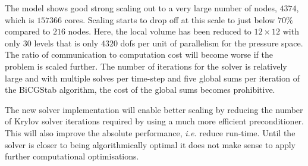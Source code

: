 \documentclass[review,times]{elsarticle}
\begin{document}
The model shows good strong scaling out to a very large number of nodes,
$4374$, which is $157366$ cores. Scaling starts to drop off at this
scale to just below $70\%$ compared to $216$ nodes. Here, the local
volume has been reduced to $12\times 12$ with only $30$ levels that is
only $4320$ dofs per unit of parallelism for the pressure space. The
ratio of communication to computation cost will become worse if the
problem is scaled further. The number of iterations for the
solver is relatively large and with multiple solves per time-step and
five global sums per iteration of the BiCGStab algorithm, the
cost of the global sums becomes prohibitive.

The new solver implementation will enable better scaling by reducing
the number of Krylov solver iterations required by using a much more
efficient preconditioner. This will also improve the absolute
performance, {\em i.e.} reduce run-time. Until the solver is closer to
being algorithmically optimal it does not make sense to apply further
computational optimisations.
\end{document}
